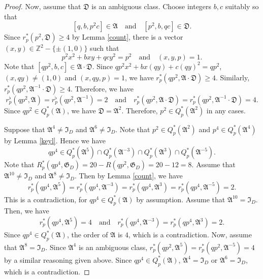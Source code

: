 \documentclass{amsart}
\theoremstyle{definition}
\theoremstyle{remark}
\numberwithin{equation}{section}
\begin{document}
\begin{proof}
Now, assume that $\mathfrak D$ is an ambiguous class. Choose integers $b, c$ suitably so that 
$$
[q,b,p^2c] \in \mathfrak A\quad \text{and} \quad [p^2,b,qc] \in \mathfrak D.
$$ 
Since $r_p^*(p^2,\mathfrak D) \ge 4$ by Lemma \ref{count}, there is a vector $(x,y) \in {{\mathbb Z}}^2-\{\pm(1,0)\}$ such that 
$$
p^2x^2+bxy+qcy^2=p^2\quad \text{and} \quad (x,y,p)=1.
$$  
Note that $[qp^2,b,c] \in \mathfrak A\cdot\mathfrak D$. Since $qp^2x^2+bx(qy)+c(qy)^2=qp^2$, $(x,qy) \ne (1,0)$ and $(x,qy,p)=1$, we have $r_p^*(qp^2,\mathfrak A\cdot\mathfrak D) \ge 4$. Similarly,  $r_p^*(qp^2,\mathfrak A^{-1}\cdot\mathfrak D) \ge 4$. Therefore, we have 
$$
r_p^{\flat}(qp^2,\mathfrak A) =r_p^{\flat}(qp^2,\mathfrak A^{-1})=2 \quad \text{and} \quad r_p^*(qp^2,\mathfrak A\cdot\mathfrak D)=r_p^*(qp^2,\mathfrak A^{-1}\cdot\mathfrak D)=4.
$$
Since $qp^2 \in Q_p^*(\mathfrak A)$, we have $\mathfrak D=\mathfrak A^2$.  Therefore, $p^2 \in Q_p^*(\mathfrak A^2)$ in any cases. 

Suppose that $\mathfrak A^4 \ne \mathfrak I_D$ and $\mathfrak A^6 \ne \mathfrak I_D$.   Note that $p^2 \in Q_p^*(\mathfrak A^2)$ and $p^4 \in Q_p^*(\mathfrak A^4)$ by Lemma \ref{keyl}.  Hence we have 
$$
qp^4 \in Q_p^*(\mathfrak A^5) \cap Q_p^*(\mathfrak A^{-3}) \cap Q_p^*(\mathfrak A^3) \cap Q_p^*(\mathfrak A^{-5}).
$$
 Note that $R_p^*(qp^4,\mathfrak G_D)=20-R(qp^2,\mathfrak G_D)=20-12=8$.  Assume that $\mathfrak A^{10} \ne \mathfrak I_D$  and $\mathfrak A^{8} \ne \mathfrak I_D$. 
Then by Lemma \ref{count},  we have 
$$
r_p^*(qp^4,\mathfrak A^5)=r_p^*(qp^4,\mathfrak A^{-3})=r_p^*(qp^4,\mathfrak A^{3})=r_p^*(qp^4,\mathfrak A^{-5})=2.
$$
This is a contradiction, for $qp^4 \in Q_p^*(\mathfrak A)$ by assumption.
Assume that $\mathfrak A^{10} = \mathfrak I_D$. Then, we have
$$
r_p^*(qp^4,\mathfrak A^5)=4 \quad \text{and} \quad r_p^*(qp^4,\mathfrak A^{-3})=r_p^*(qp^4,\mathfrak A^{3})=2.
$$
Since $qp^4 \in Q_p^*(\mathfrak A)$,  the order of $\mathfrak A$ is $4$, which is a contradiction.
Now, assume that $\mathfrak A^{8} = \mathfrak I_D$. 
Since $\mathfrak A^4$ is an ambiguous class, $r_p^*(qp^2,\mathfrak A^5)=r_p^*(qp^2,\mathfrak A^{-5})=4$ by a similar reasoning given above. Since $qp^4 \in Q_p^*(\mathfrak A)$, $\mathfrak A^4=\mathfrak I_D$ or $\mathfrak A^6=\mathfrak I_D$, which is a contradiction. 


\end{proof}
\end{document}
